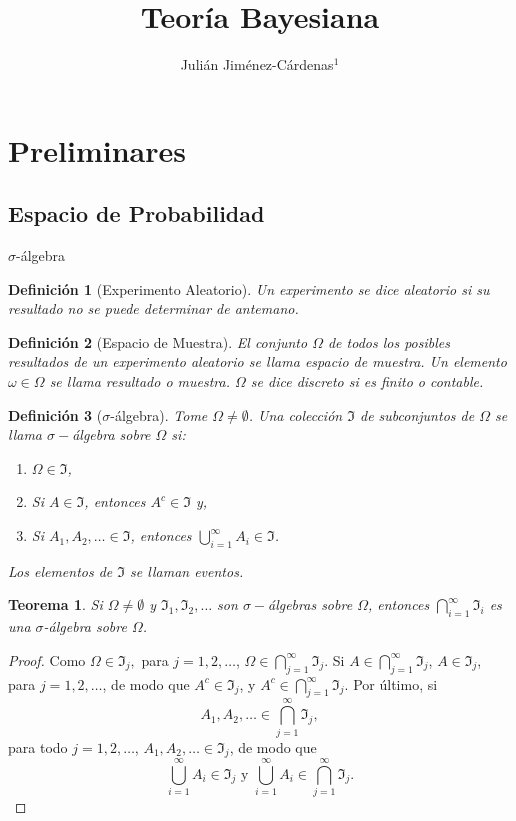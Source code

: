 \documentclass{beamer}
\title[Teoría Bayesiana]{Teoría Bayesiana}
\author[Julián Jiménez-Cárdenas]{Julián Jiménez-Cárdenas$^{1}$}
\institute{$^{1}$Universidad Nacional de Colombia, Bogotá. \and \texttt{juojimenezca@unal.edu.co}}
\date{}
\newtheorem{defi}{Definición}[section]
\newtheorem{theo}{Teorema}[section]
\begin{document}
	\frame{\titlepage}
	\begin{frame}[allowframebreaks]

		\tableofcontents		
	\end{frame}
	
	\section{Preliminares}
	\subsection{Espacio de Probabilidad}
	\begin{frame}[allowframebreaks]{$\sigma$-álgebra}
	\begin{defi}[Experimento Aleatorio]
		Un experimento se dice aleatorio si su resultado no se puede determinar de antemano.
	\end{defi}
	\begin{defi}[Espacio de Muestra]
		El conjunto $\Omega$ de todos los posibles resultados de un experimento aleatorio se llama espacio de muestra. Un elemento $\omega\in\Omega$ se llama resultado o muestra. $\Omega$ se dice discreto si es finito o contable.
	\end{defi}	
	\begin{defi}[$\sigma$-álgebra]
		Tome $\Omega\neq\emptyset$. Una colección $\Im$ de subconjuntos de $\Omega$ se llama $\sigma-$álgebra sobre $\Omega$ si:
		\begin{enumerate}
			\item $\Omega\in\Im$,
			\item Si $A\in\Im$, entonces $A^c\in\Im$ y,
			\item Si $A_1,A_2,\dots\in\Im$, entonces $\bigcup_{i=1}^\infty A_i\in\Im$.
		\end{enumerate}
		Los elementos de $\Im$ se llaman eventos.
	\end{defi}
	\begin{theo}
		Si $\Omega\neq\emptyset$ y $\Im_1,\Im_2,\dots$ son $\sigma-$álgebras sobre $\Omega$, entonces $\bigcap_{i=1}^\infty \Im_i$ es una $\sigma$-álgebra sobre $\Omega$.
	\end{theo}		
	
	\begin{proof}
		Como $\Omega\in\Im_j,$ para $j=1,2,\dots$, $\Omega\in\bigcap_{j=1}^\infty \Im_j$. Si $A\in\bigcap_{j=1}^\infty\Im_j$, $A\in\Im_j$, para $j=1,2,\dots$, de modo que $A^c\in\Im_j$, y $A^c\in\bigcap_{j=1}^\infty\Im_j$. Por último, si 
		$$A_1,A_2,\dots\in\bigcap_{j=1}^\infty\Im_j,$$
		para todo $j=1,2,\dots$, $A_1,A_2,\dots\in\Im_j$, de modo que
		$$\bigcup_{i=1}^\infty A_i\in\Im_j\text{ y }\bigcup_{i=1}^\infty A_i\in\bigcap_{j=1}^\infty\Im_j.$$ 
	\end{proof}
	

\end{frame}
\end{document}
